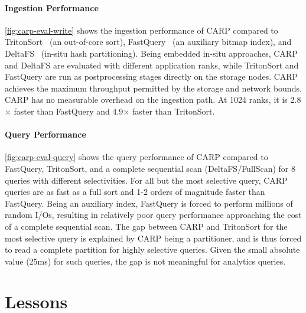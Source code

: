 \paragraph{Ingestion Performance} \cref{fig:carp-eval-write} shows the ingestion performance of CARP
compared to TritonSort~\cite{Rasmu2011:TritonSort} (an out-of-core sort), FastQuery~\cite{Byna2012}
(an auxiliary bitmap index), and DeltaFS~\cite{Zheng2018:DeltaFS} (in-situ hash partitioning).
Being embedded in-situ approaches, CARP and DeltaFS are evaluated with different application ranks,
while TritonSort and FastQuery are run as postprocessing stages directly on the storage nodes.
CARP achieves the maximum throughput permitted by the storage and network bounds.
CARP has no measurable overhead on the ingestion path.
At 1024 ranks, it is 2.8$\times$ faster than FastQuery and 4.9$\times$ faster than TritonSort.

\paragraph{Query Performance} \cref{fig:carp-eval-query} shows the query performance of CARP
compared to FastQuery, TritonSort, and a complete sequential scan (DeltaFS/FullScan) for 8 queries
with different selectivities.
For all but the most selective query, CARP queries are as fast as a full sort and 1-2 orders of
magnitude faster than FastQuery.
Being an auxiliary index, FastQuery is forced to perform millions of random I/Os, resulting in
relatively poor query performance approaching the cost of a complete sequential scan.
The gap between CARP and TritonSort for the most selective query is explained by CARP being a
partitioner, and is thus forced to read a complete partition for highly selective queries.
Given the small absolute value (25ms) for such queries, the gap is not meaningful for analytics
queries.

\section{Lessons}


